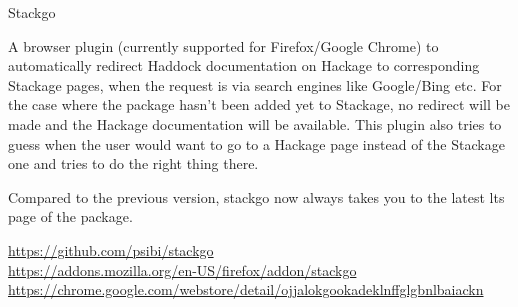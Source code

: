 \begin{hcarentry}[new]{Stackgo}
\makeheader

A browser plugin (currently supported for Firefox/Google Chrome) to
automatically redirect Haddock documentation on Hackage to
corresponding Stackage pages, when the request is via search engines
like Google/Bing etc. For the case where the package hasn't been added
yet to Stackage, no redirect will be made and the Hackage
documentation will be available. This plugin also tries to guess when
the user would want to go to a Hackage page instead of the Stackage
one and tries to do the right thing there.

Compared to the previous version, stackgo now always takes you to the
latest lts page of the package.

\FurtherReading
\url{https://github.com/psibi/stackgo} \\
\url{https://addons.mozilla.org/en-US/firefox/addon/stackgo} \\
\url{https://chrome.google.com/webstore/detail/ojjalokgookadeklnffglgbnlbaiackn}
\end{hcarentry}
